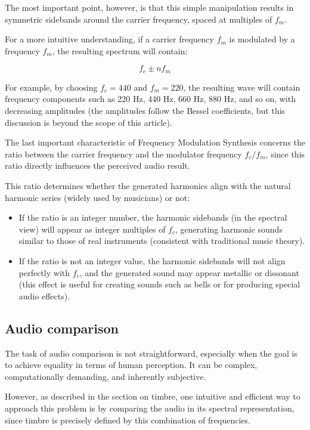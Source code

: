 \documentclass[sigconf,natbib=false]{acmart}
\begin{document}
The most important point, however, is that this simple manipulation results in symmetric sidebands around the carrier frequency, spaced at multiples of \( f_m \).

For a more intuitive understanding, if a carrier frequency \( f_m \) is modulated by a frequency \( f_m \), the resulting spectrum will contain:

\[
f_c \pm n f_m
\]

For example, by choosing \( f_c = 440 \) and \( f_m = 220 \), the resulting wave will contain frequency components such as 220 Hz, 440 Hz, 660 Hz, 880 Hz, and so on, with decreasing amplitudes (the amplitudes follow the Bessel coefficients, but this discussion is beyond the scope of this article).

The last important characteristic of Frequency Modulation Synthesis concerns the ratio between the carrier frequency and the modulator frequency \( f_c / f_m \), since this ratio directly influences the perceived audio result.

This ratio determines whether the generated harmonics align with the natural harmonic series (widely used by musicians) or not:

\begin{itemize}
    \item If the ratio is an integer number, the harmonic sidebands (in the spectral view) will appear as integer multiples of \( f_c \), generating harmonic sounds similar to those of real instruments (consistent with traditional music theory).
    \item If the ratio is not an integer value, the harmonic sidebands will not align perfectly with \( f_c \), and the generated sound may appear metallic or dissonant (this effect is useful for creating sounds such as bells or for producing special audio effects).
\end{itemize}

\subsection{Audio comparison}

The task of audio comparison is not straightforward, especially when the goal is to achieve equality in terms of human perception. It can be complex, computationally demanding, and inherently subjective.

However, as described in the section on timbre, one intuitive and efficient way to approach this problem is by comparing the audio in its spectral representation, since timbre is precisely defined by this combination of frequencies.
\end{document}
